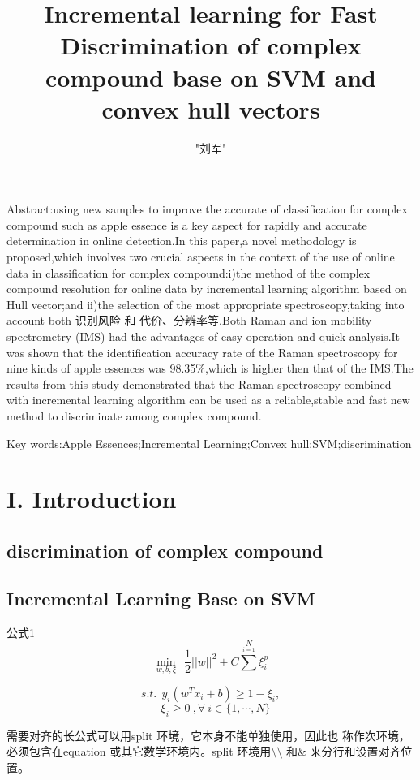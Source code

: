 \documentclass{article}
\author{"刘军"}
\title{Incremental learning for Fast Discrimination of complex compound base on SVM and convex hull vectors }
\begin{document}
\maketitle

Abstract:using new samples to improve the accurate of classification for complex compound such as apple essence is a key aspect for rapidly and accurate determination in online detection.In this paper,a novel methodology is proposed,which involves two crucial aspects in the context of the use of online data in classification for complex compound:i)the method of the complex compound resolution for online data by incremental learning algorithm based on Hull vector;and ii)the selection of the most appropriate spectroscopy,taking into account both 识别风险 和 代价、分辨率等.Both Raman and ion mobility spectrometry (IMS) had the advantages of easy operation and  quick  analysis.It was shown that the identification accuracy rate of the Raman spectroscopy for nine kinds of apple essences was 98.35\%,which is higher then that of the IMS.The results from this study demonstrated that the Raman spectroscopy combined with incremental learning algorithm can be used as a reliable,stable and fast new method to discriminate among complex compound.


Key words:Apple Essences;Incremental Learning;Convex hull;SVM;discrimination
\section{I. Introduction}

    \subsection{discrimination of complex compound}


    \subsection{Incremental Learning Base on SVM}

公式1
\begin{equation}
\min \limits_{w,b,\xi} \ \ \frac{1}{2}||w||^2+C\sum^{N} \limits_{i=1}\xi^p_i \tag{1}
\end{equation}


$$
s.t. \ \ y_i(w^T x_i + b)\geq 1-\xi_i,
$$
$$
\ \ \ \ \xi_i \geq  0 \ ,\forall \ i \in \{1,\cdots,N\}
$$

需要对齐的长公式可以用split 环境，它本身不能单独使用，因此也
称作次环境，必须包含在equation 或其它数学环境内。split 环境用$\setminus\setminus$
和\& 来分行和设置对齐位置。
\end{document}
